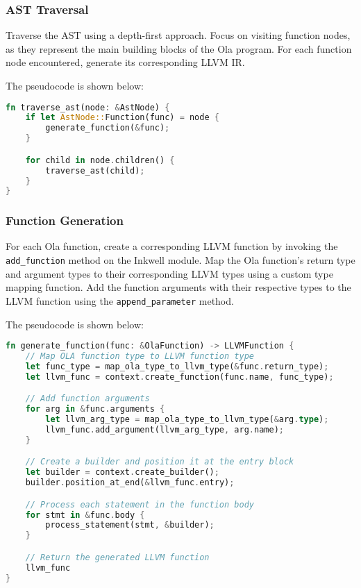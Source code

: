 \subsubsection*{AST Traversal}

Traverse the AST using a depth-first approach. Focus on visiting function nodes, as they represent the main building blocks of the Ola program. For each function node encountered, generate its corresponding LLVM IR.

The pseudocode is shown below:

\begin{lstlisting}[language=Rust]
  fn traverse_ast(node: &AstNode) {
    if let AstNode::Function(func) = node {
        generate_function(&func);
    }

    for child in node.children() {
        traverse_ast(child);
    }
}
\end{lstlisting}

\subsubsection*{Function Generation}

For each Ola function, create a corresponding LLVM function by invoking the \texttt{add\_function} method on the Inkwell module. Map the Ola function's return type and argument types to their corresponding LLVM types using a custom type mapping function. Add the function arguments with their respective types to the LLVM function using the \texttt{append\_parameter} method.

The pseudocode is shown below:

\begin{lstlisting}[language=Rust]
  fn generate_function(func: &OlaFunction) -> LLVMFunction {
    // Map OLA function type to LLVM function type
    let func_type = map_ola_type_to_llvm_type(&func.return_type);
    let llvm_func = context.create_function(func.name, func_type);

    // Add function arguments
    for arg in &func.arguments {
        let llvm_arg_type = map_ola_type_to_llvm_type(&arg.type);
        llvm_func.add_argument(llvm_arg_type, arg.name);
    }

    // Create a builder and position it at the entry block
    let builder = context.create_builder();
    builder.position_at_end(&llvm_func.entry);

    // Process each statement in the function body
    for stmt in &func.body {
        process_statement(stmt, &builder);
    }

    // Return the generated LLVM function
    llvm_func
}
\end{lstlisting}

